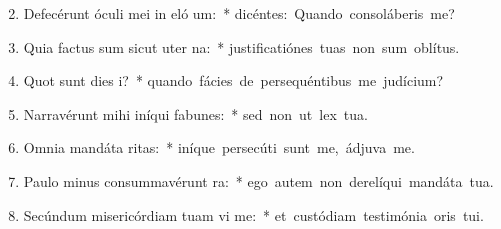 \begin{flushleft}
\begin{enumerate}[leftmargin=*]
\setcounter{enumi}{1}

\item Defecérunt óculi mei in eló um:~* \mbox{dicéntes: Quando consoláberis me?}
\item Quia factus sum sicut uter  na:~* \mbox{justificatiónes tuas non sum oblítus.}
\item Quot sunt dies  i?~* \mbox{quando fácies de persequéntibus me judícium?}
\item Narravérunt mihi iníqui fabunes:~* \mbox{sed non ut lex tua.}
\item Omnia mandáta  ritas:~* \mbox{iníque persecúti sunt me, ádjuva me.}
\item Paulo minus consummavérunt   ra:~* \mbox{ego autem non derelíqui mandáta tua.}
\item Secúndum misericórdiam tuam vi me:~* \mbox{et custódiam testimónia oris tui.}


\end{enumerate}
\end{flushleft}

